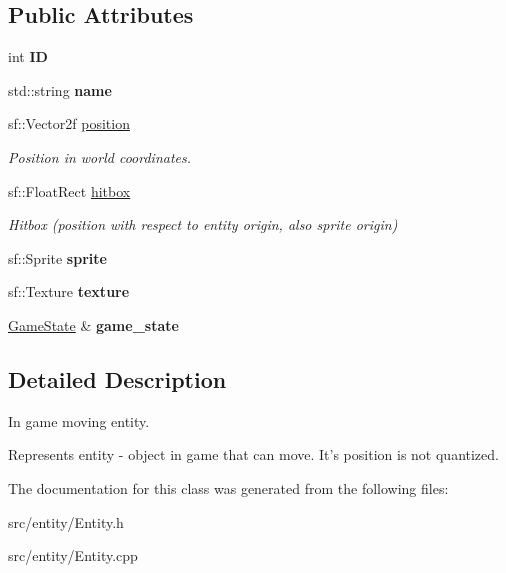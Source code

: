\subsection*{Public Attributes}
\begin{DoxyCompactItemize}
\item 
\hypertarget{classEntity_a5c92b546dedae9ce473274d82c8585f6}{int {\bfseries I\-D}}\label{classEntity_a5c92b546dedae9ce473274d82c8585f6}

\item 
\hypertarget{classEntity_a931b21fbdebb1a5963b4bcab5df128f5}{std\-::string {\bfseries name}}\label{classEntity_a931b21fbdebb1a5963b4bcab5df128f5}

\item 
\hypertarget{classEntity_afc349ec89c2bffef70bf6a1d95603154}{sf\-::\-Vector2f \hyperlink{classEntity_afc349ec89c2bffef70bf6a1d95603154}{position}}\label{classEntity_afc349ec89c2bffef70bf6a1d95603154}

\begin{DoxyCompactList}\small\item\em Position in world coordinates. \end{DoxyCompactList}\item 
\hypertarget{classEntity_a3bed8137e87ee1923135c5b24207da60}{sf\-::\-Float\-Rect \hyperlink{classEntity_a3bed8137e87ee1923135c5b24207da60}{hitbox}}\label{classEntity_a3bed8137e87ee1923135c5b24207da60}

\begin{DoxyCompactList}\small\item\em Hitbox (position with respect to entity origin, also sprite origin) \end{DoxyCompactList}\item 
\hypertarget{classEntity_a48ef4ab143b8d0211877c9f6be42e824}{sf\-::\-Sprite {\bfseries sprite}}\label{classEntity_a48ef4ab143b8d0211877c9f6be42e824}

\item 
\hypertarget{classEntity_ad64dd6d282432a68475f30f7c7bbdc88}{sf\-::\-Texture {\bfseries texture}}\label{classEntity_ad64dd6d282432a68475f30f7c7bbdc88}

\item 
\hypertarget{classEntity_a1ecabee173a2b7758cfc8999c6582874}{\hyperlink{classGameState}{Game\-State} \& {\bfseries game\-\_\-state}}\label{classEntity_a1ecabee173a2b7758cfc8999c6582874}

\end{DoxyCompactItemize}


\subsection{Detailed Description}
In game moving entity. 

Represents entity -\/ object in game that can move. It's position is not quantized. 

The documentation for this class was generated from the following files\-:\begin{DoxyCompactItemize}
\item 
src/entity/Entity.\-h\item 
src/entity/Entity.\-cpp\end{DoxyCompactItemize}
